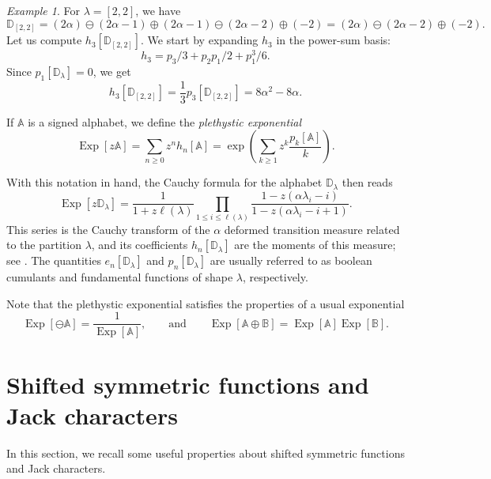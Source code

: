 \documentclass[12pt]{amsart}
\theoremstyle{remark}
\newtheorem{example}{Example}[section]
\DeclareMathOperator{\Exp}{Exp}
\newcommand{\bA}{\mathbb A}
\newcommand{\bB}{\mathbb B}
\newcommand{\bD}{\mathbb D}
\begin{document}
\begin{example}
For $\lambda=[2,2]$, we have
$$\bD_{[2,2]}=(2\alpha)\ominus(2\alpha-1)\oplus(2\alpha-1)\ominus(2\alpha-2)\oplus(-2)
=(2\alpha)\ominus(2\alpha-2)\oplus(-2).$$
Let us compute $h_3\left[\bD_{[2,2]}\right]$. We start by expanding $h_3$ in the power-sum basis:
    $$h_3=p_{3}/3+p_{2}p_1/2+p_1^3/6.$$
    Since  $p_1[\bD_\lambda]=0$, we get
    $$h_3\left[\bD_{[2,2]}\right]=\frac{1}{3}p_3\left[\bD_{[2,2]}\right]=8 \alpha^2-8\alpha.$$
\end{example}

If $\bA$ is a signed alphabet, we define the \textit{plethystic exponential} 
\begin{equation}\label{eq:pleth_exp}
  \Exp\left[z\bA\right]=\sum_{n\geq 0}z^nh_n[\bA]=\exp\left(\sum_{k\geq 1}z^k\frac{p_k[\bA]}{k}\right).  
\end{equation}


With this notation in hand, the Cauchy formula for the alphabet $\bD_\lambda$ then reads
\begin{equation}\label{eq:Cauchy_D}
  \Exp\left[z\bD_\lambda\right]=\frac{1}{1+z\ell(\lambda)}\prod_{1\leq i\leq \ell(\lambda)}\frac{1-z (\alpha \lambda_i-i)}{1-z (\alpha \lambda_i-i+1)}.  
\end{equation}
This series is the Cauchy transform of the $\alpha$ deformed transition measure related to the partition $\lambda$, and its coefficients $h_n[\bD_\lambda]$ are the moments of this measure; see \cite[Section 2]{DolegaFeray2016}. The quantities $e_n[\bD_\lambda]$ and $p_n[\bD_\lambda]$ are usually referred to as boolean cumulants and fundamental functions of shape $\lambda$, respectively.

Note that the plethystic exponential satisfies the properties of a usual exponential
\begin{equation}\label{eq:pleth_exp_properties}
  \Exp\left[\ominus \bA\right]=\frac{1}{\Exp\left[ \bA\right]}, \qquad \text{and} \qquad\Exp\left[\bA\oplus \bB\right]=\Exp\left[ \bA\right]\Exp\left[ \bB\right].
\end{equation}


\section{Shifted symmetric functions and Jack characters}\label{sec shifted fcts}

In this section, we recall some useful properties about shifted symmetric functions and Jack characters.
\end{document}
